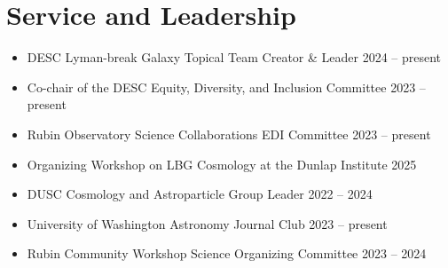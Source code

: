 \section{Service and Leadership}
\begin{itemize}
    \item DESC Lyman-break Galaxy Topical Team Creator \& Leader \hfill 2024 -- present

    \item Co-chair of the DESC Equity, Diversity, and Inclusion Committee \hfill 2023 -- present

    \item Rubin Observatory Science Collaborations EDI Committee \hfill 2023 -- present

    \item Organizing Workshop on LBG Cosmology at the Dunlap Institute \hfill 2025

    \item DUSC Cosmology and Astroparticle Group Leader \hfill 2022 -- 2024

    \item University of Washington Astronomy Journal Club \hfill 2023 -- present

    \item Rubin Community Workshop Science Organizing Committee \hfill 2023 -- 2024


\end{itemize}
